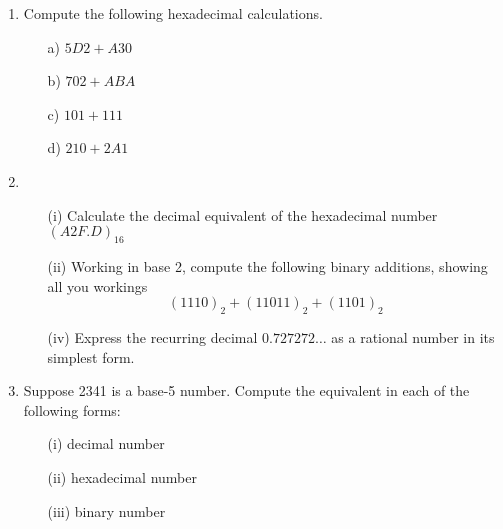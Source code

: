 \documentclass[]{report}
\begin{document}
\begin{enumerate}
	
	\item Compute the following hexadecimal calculations.
	\begin{multicols}{4}
		\begin{itemize}
			\item[a)] $5D2+A30$
			\item[b)] $702+ABA$
\item[c)] $101+111$
			\item[d)] $210+2A1$
		\end{itemize}
	\end{multicols}
	
\item 
\begin{itemize}
\item[(i)] Calculate the decimal equivalent of the hexadecimal number $(A2F.D)_{16}$
\item[(ii)] Working in base 2, compute the following binary additions, showing all you workings
\[(1110)_2 + (11011)_2 + (1101)_2 \]
\item[(iv)] Express the recurring decimal $0.727272\ldots$ as a rational number in its simplest form.
\end{itemize}


\item %
Suppose 2341 is a base-5 number.
Compute the equivalent in each of the following forms:
\begin{itemize}
\item[(i)] decimal number
\item[(ii)] hexadecimal number
\item[(iii)] binary number
\end{itemize}



\end{enumerate}
\end{document}
